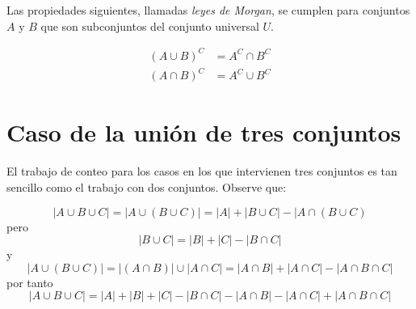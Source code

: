 \documentclass{article}
\begin{document}
    Las propiedades siguientes, llamadas \textit{leyes de Morgan}, se cumplen para conjuntos $A$ y $B$ que son subconjuntos del conjunto universal $U$.

    \begin{subequations}
        \begin{align}
            (A \cup B)^C &= A^C \cap B^C\\
            (A \cap B)^C &= A^C \cup B^C
        \end{align}
    \end{subequations}
    
    \raggedright{}

    \section{Caso de la unión de tres conjuntos}
    
    El trabajo de conteo para los casos en los que intervienen tres conjuntos es tan sencillo como el trabajo con dos conjuntos. Observe que:

    \begin{equation*}
        | A \cup B \cup C | = | A \cup ( B \cup C ) | = | A | + | B \cup C | - | A \cap (B \cup C)
    \end{equation*}
    pero
    \begin{equation*}
        | B \cup C | = | B | + | C | - | B \cap C |
    \end{equation*}
    y
    \begin{equation*}
        | A \cup ( B \cup C ) | = |(A \cap B)| \cup |A \cap C| = | A \cap B | + |A \cap C| - |A \cap B \cap C |
    \end{equation*}
    por tanto
    \begin{equation}
        | A \cup B \cup C | = | A | + | B | + | C | - |B \cap C| - |A \cap B| - |A \cap C| + |A \cap B \cap C |
    \end{equation}
\end{document}
